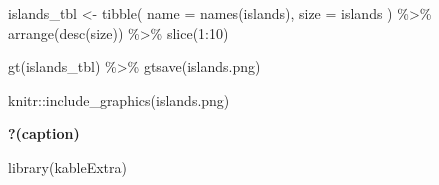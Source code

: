 \documentclass[
  letterpaper,
  DIV=11,
  numbers=noendperiod]{scrartcl}
\newenvironment{Shaded}{\begin{snugshade}}{\end{snugshade}}
\newcommand{\AttributeTok}[1]{\textcolor[rgb]{0.40,0.45,0.13}{#1}}
\newcommand{\DecValTok}[1]{\textcolor[rgb]{0.68,0.00,0.00}{#1}}
\newcommand{\FunctionTok}[1]{\textcolor[rgb]{0.28,0.35,0.67}{#1}}
\newcommand{\NormalTok}[1]{\textcolor[rgb]{0.00,0.23,0.31}{#1}}
\newcommand{\OtherTok}[1]{\textcolor[rgb]{0.00,0.23,0.31}{#1}}
\newcommand{\SpecialCharTok}[1]{\textcolor[rgb]{0.37,0.37,0.37}{#1}}
\newcommand{\StringTok}[1]{\textcolor[rgb]{0.13,0.47,0.30}{#1}}
\begin{document}
\begin{Shaded}
\begin{Highlighting}[]
\NormalTok{islands\_tbl }\OtherTok{\textless{}{-}} 
  \FunctionTok{tibble}\NormalTok{(}
    \AttributeTok{name =} \FunctionTok{names}\NormalTok{(islands),}
    \AttributeTok{size =}\NormalTok{ islands}
\NormalTok{  ) }\SpecialCharTok{\%\textgreater{}\%}
  \FunctionTok{arrange}\NormalTok{(}\FunctionTok{desc}\NormalTok{(size)) }\SpecialCharTok{\%\textgreater{}\%}
  \FunctionTok{slice}\NormalTok{(}\DecValTok{1}\SpecialCharTok{:}\DecValTok{10}\NormalTok{)}


\FunctionTok{gt}\NormalTok{(islands\_tbl) }\SpecialCharTok{\%\textgreater{}\%} 
  \FunctionTok{gtsave}\NormalTok{(}\StringTok{\textquotesingle{}islands.png\textquotesingle{}}\NormalTok{)}

\NormalTok{knitr}\SpecialCharTok{::}\FunctionTok{include\_graphics}\NormalTok{(}\StringTok{\textquotesingle{}islands.png\textquotesingle{}}\NormalTok{)}
\end{Highlighting}
\end{Shaded}

\begin{table}

\caption{\textbf{?(caption)}}\begin{minipage}[t]{\linewidth}

{\centering 


}

\end{minipage}%

\end{table}

\begin{Shaded}
\begin{Highlighting}[]
\FunctionTok{library}\NormalTok{(kableExtra)}
\end{Highlighting}
\end{Shaded}
\end{document}
